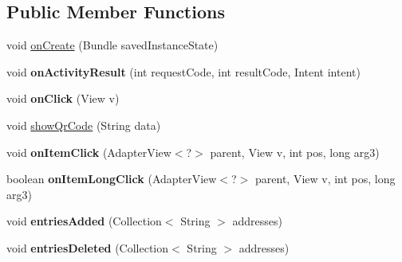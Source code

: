 \subsection*{Public Member Functions}
\begin{DoxyCompactItemize}
\item 
void \hyperlink{classat_1_1fhooe_1_1kls_1_1_secure_s_m_s_activity_a0b21957f8ba9fd5ed0b7bb5c99bdd9af}{on\-Create} (Bundle saved\-Instance\-State)
\item 
\hypertarget{classat_1_1fhooe_1_1kls_1_1_secure_s_m_s_activity_a16233c873fe15f6fc3a9493e317d6dd5}{void {\bfseries on\-Activity\-Result} (int request\-Code, int result\-Code, Intent intent)}\label{classat_1_1fhooe_1_1kls_1_1_secure_s_m_s_activity_a16233c873fe15f6fc3a9493e317d6dd5}

\item 
\hypertarget{classat_1_1fhooe_1_1kls_1_1_secure_s_m_s_activity_a59a2446d9e1815609430c8e61a330af7}{void {\bfseries on\-Click} (View v)}\label{classat_1_1fhooe_1_1kls_1_1_secure_s_m_s_activity_a59a2446d9e1815609430c8e61a330af7}

\item 
void \hyperlink{classat_1_1fhooe_1_1kls_1_1_secure_s_m_s_activity_adf50cc4527821a1612e58885270b672e}{show\-Qr\-Code} (String data)
\item 
\hypertarget{classat_1_1fhooe_1_1kls_1_1_secure_s_m_s_activity_abc18ec76a1706fb5bbcb62b91e0fefc9}{void {\bfseries on\-Item\-Click} (Adapter\-View$<$?$>$ parent, View v, int pos, long arg3)}\label{classat_1_1fhooe_1_1kls_1_1_secure_s_m_s_activity_abc18ec76a1706fb5bbcb62b91e0fefc9}

\item 
\hypertarget{classat_1_1fhooe_1_1kls_1_1_secure_s_m_s_activity_ab475491459d7a80071310c26bbc951e1}{boolean {\bfseries on\-Item\-Long\-Click} (Adapter\-View$<$?$>$ parent, View v, int pos, long arg3)}\label{classat_1_1fhooe_1_1kls_1_1_secure_s_m_s_activity_ab475491459d7a80071310c26bbc951e1}

\item 
\hypertarget{classat_1_1fhooe_1_1kls_1_1_secure_s_m_s_activity_a54ec11da55a29dcfb1a43191ab67085b}{void {\bfseries entries\-Added} (Collection$<$ String $>$ addresses)}\label{classat_1_1fhooe_1_1kls_1_1_secure_s_m_s_activity_a54ec11da55a29dcfb1a43191ab67085b}

\item 
\hypertarget{classat_1_1fhooe_1_1kls_1_1_secure_s_m_s_activity_a1f6054d4827d23f98008c7bda8def44d}{void {\bfseries entries\-Deleted} (Collection$<$ String $>$ addresses)}\label{classat_1_1fhooe_1_1kls_1_1_secure_s_m_s_activity_a1f6054d4827d23f98008c7bda8def44d}


\end{DoxyCompactItemize}
